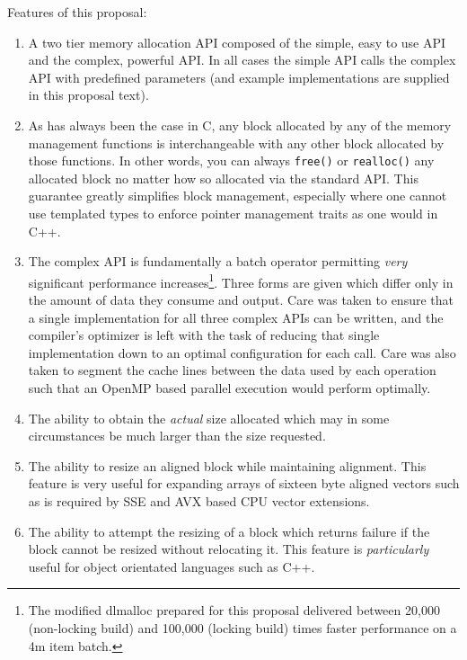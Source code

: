\documentclass[wd]{isov2}
\begin{document}
{\begin{introduction}
Features of this proposal:
\begin{enumerate}
\item A two tier memory allocation API composed of the simple, easy to use API and the complex, powerful API. In all cases the simple API calls the complex API with predefined parameters (and example implementations are supplied in this proposal text).
\item As has always been the case in C, any block allocated by any of the memory management functions is interchangeable with any other block allocated by those functions. In other words, you can always \texttt{free()} or \texttt{realloc()} any allocated block no matter how so allocated via the standard API. This guarantee greatly simplifies block management, especially where one cannot use templated types to enforce pointer management traits as one would in C++.
\item The complex API is fundamentally a batch operator permitting \emph{very} significant performance increases\footnote{The modified dlmalloc prepared for this proposal delivered between 20,000 (non-locking build) and 100,000 (locking build) times faster performance on a 4m item batch.}. Three forms are given which differ only in the amount of data they consume and output. Care was taken to ensure that a single implementation for all three complex APIs can be written, and the compiler's optimizer is left with the task of reducing that single implementation down to an optimal configuration for each call. Care was also taken to segment the cache lines between the data used by each operation such that an OpenMP based parallel execution would perform optimally.
\item The ability to obtain the \emph{actual} size allocated which may in some circumstances be much larger than the size requested.
\item The ability to resize an aligned block while maintaining alignment. This feature is very useful for expanding arrays of sixteen byte aligned vectors such as is required by SSE and AVX based CPU vector extensions.
\item The ability to attempt the resizing of a block which returns failure if the block cannot be resized without relocating it. This feature is \emph{particularly} useful for object orientated languages such as C++.

\end{enumerate}
\end{introduction}}
\end{document}
